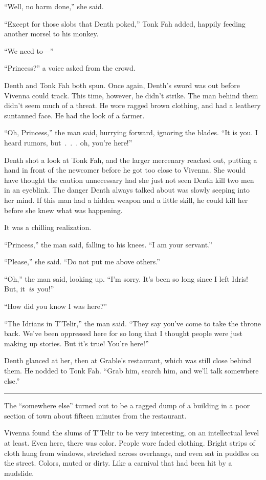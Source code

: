 “Well, no harm done,” she said.

“Except for those slobs that Denth poked,” Tonk Fah added, happily feeding another morsel to his monkey.

“We need to—”

“Princess?” a voice asked from the crowd.

Denth and Tonk Fah both spun. Once again, Denth’s sword was out before Vivenna could track. This time, however, he didn’t strike. The man behind them didn’t seem much of a threat. He wore ragged brown clothing, and had a leathery suntanned face. He had the look of a farmer.

“Oh, Princess,” the man said, hurrying forward, ignoring the blades. “It is you. I heard rumors, but~.~.~. oh, you’re here!”

Denth shot a look at Tonk Fah, and the larger mercenary reached out, putting a hand in front of the newcomer before he got too close to Vivenna. She would have thought the caution unnecessary had she just not seen Denth kill two men in an eyeblink. The danger Denth always talked about was slowly seeping into her mind. If this man had a hidden weapon and a little skill, he could kill her before she knew what was happening.

It was a chilling realization.

“Princess,” the man said, falling to his knees. “I am your servant.”

“Please,” she said. “Do not put me above others.”

“Oh,” the man said, looking up. “I’m sorry. It’s been so long since I left Idris! But, it~\textit{is}~you!”

“How did you know I was here?”

“The Idrians in T’Telir,” the man said. “They say you’ve come to take the throne back. We’ve been oppressed here for so long that I thought people were just making up stories. But it’s true! You’re here!”

Denth glanced at her, then at Grable’s restaurant, which was still close behind them. He nodded to Tonk Fah. “Grab him, search him, and we’ll talk somewhere else.”

\bigskip \hrule \bigskip

The “somewhere else” turned out to be a ragged dump of a building in a poor section of town about fifteen minutes from the restaurant.

Vivenna found the slums of T’Telir to be very interesting, on an intellectual level at least. Even here, there was color. People wore faded clothing. Bright strips of cloth hung from windows, stretched across overhangs, and even sat in puddles on the street. Colors, muted or dirty. Like a carnival that had been hit by a mudslide.

